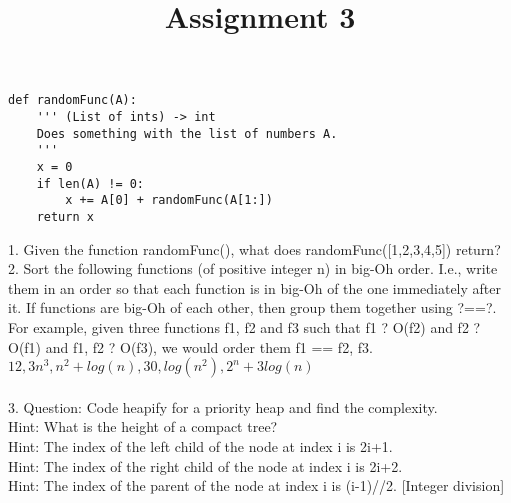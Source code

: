 \documentclass[11pt]{article}
\title{Assignment 3}
\begin{document}
\begin{lstlisting}
def randomFunc(A):
	''' (List of ints) -> int
	Does something with the list of numbers A.
	'''
	x = 0
	if len(A) != 0:
		x += A[0] + randomFunc(A[1:])
	return x 
\end{lstlisting}


1. Given the function randomFunc(), what does randomFunc([1,2,3,4,5]) return?\\


2. Sort the following functions (of positive integer n) in big-Oh order. I.e., write them in an order so that each function is in big-Oh of the one immediately after it. If functions are big-Oh of each other, then group them together using ?==?.
For example, given three functions f1, f2 and f3 such that f1 ? O(f2) and f2 ? O(f1) and f1, f2 ? O(f3),
we would order them f1 == f2, f3.\\

$12, 3n^3, n^2+log(n), 30, log(n^2), 2^n+3log(n)$\\
\\
3. Question: Code heapify for a priority heap and find the complexity. \\
Hint: What is the height of a compact tree?\\
Hint: The index of the left child of the node at index i is 2i+1.\\
Hint: The index of the right child of the node at index i is 2i+2.\\
Hint: The index of the parent of the node at index i is (i-1)//2. [Integer division]\\
\end{document}

